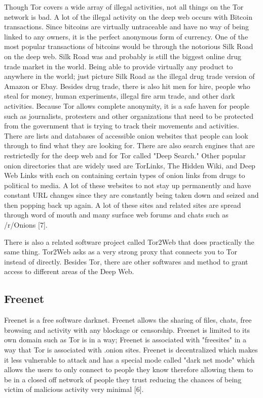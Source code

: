 \documentclass[twocolumn,letterpaper,10pt]{article}
\begin{document}
Though Tor covers a wide array of illegal activities, not all things on the Tor network is bad. A lot of the illegal activity on the deep web occurs with Bitcoin transactions. Since bitcoins are virtually untraceable and have no way of being linked to any owners, it is the perfect anonymous form of currency. One of the most popular transactions of bitcoins would be through the notorious Silk Road on the deep web. Silk Road was and probably is still the biggest online drug trade market in the world. Being able to provide virtually any product to anywhere in the world; just picture Silk Road as the illegal drug trade version of Amazon or Ebay. Besides drug trade, there is also hit men for hire, people who steal for money, human experiments, illegal fire arm trade, and other dark activities. Because Tor allows complete anonymity, it is a safe haven for people such as journalists, protesters and other organizations that need to be protected from the government that is trying to track their movements and activities. There are lists and databases of accessible onion websites that people can look through to find what they are looking for. There are also search engines that are restrictedly for the deep web and for Tor called "Deep Search." Other popular onion directories that are widely used are TorLinks, The Hidden Wiki, and Deep Web Links with each on containing certain types of onion links from drugs to political to media. A lot of these websites to not stay up permanently and have constant URL changes since they are constantly being taken down and seized and then popping back up again. A lot of these sites and related sites are spread through word of mouth and many surface web forums and chats such as /r/Onions [7].

There is also a related software project called Tor2Web that does practically the same thing. Tor2Web asks as a very strong proxy that connects you to Tor instead of directly. Besides Tor, there are other softwares and method to grant access to different areas of the Deep Web. 

\subsection{Freenet}

Freenet is a free software darknet. Freenet allows the sharing of files, chats, free browsing and activity with any blockage or censorship. Freenet is limited to its own domain such as Tor is in a way; Freenet is associated with "freesites" in a way that Tor is associated with .onion sites. Freenet is decentralized which makes it less vulnerable to attack and has a special mode called "dark net mode" which allows the users to only connect to people they know therefore allowing them to be in a closed off network of people they trust reducing the chances of being victim of malicious activity very minimal [6].
\end{document}
